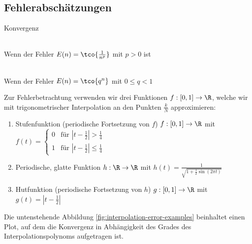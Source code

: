 
\newsection
\subsection{Fehlerabschätzungen}

\begin{definition}[]{Konvergenz}
    \begin{multicols}{2}
        \\
        Wenn der Fehler $E(n) = \tco{\frac{1}{n^p}}$ mit $p > 0$ ist

        \\
        Wenn der Fehler $E(n) = \tco{q^n}$ mit $0 \leq q < 1$
    \end{multicols}
\end{definition}

\numberingOff
\inlineex Zur Fehlerbetrachtung verwenden wir drei Funktionen $f : [0, 1] \rightarrow \R$, welche wir mit trigonometrischer Interpolation an den Punkten $\frac{k}{N}$ approximieren:
\begin{enumerate}[label=(\Roman*)]
    \item Stufenfunktion (periodische Fortsetzung von $f$) $f : [0, 1] \rightarrow \R$ mit $f(t) = \begin{cases}
                  0 & \text{für } \left| t - \frac{1}{2} \right| > \frac{1}{4}    \\
                  1 & \text{für } \left| t - \frac{1}{2} \right| \leq \frac{1}{4}
              \end{cases}$
    \item Periodische, glatte Funktion $h: \R \rightarrow \R$ mit $h(t) = \displaystyle \frac{1}{\sqrt{1 + \frac{1}{2} \sin(2\pi t)}}$
    \item Hutfunktion (periodische Fortsetzung von $h$) $g : [0, 1] \rightarrow \R$ mit $g(t) = \left| t - \frac{1}{2} \right|$
\end{enumerate}
Die untenstehende Abbildung \ref{fig:interpolation-error-examples} beinhaltet einen Plot, auf dem die Konvergenz in Abhängigkeit des Grades des Interpolationspolynoms aufgetragen ist.
\numberingOn

